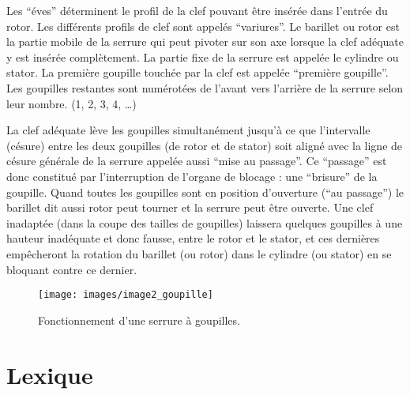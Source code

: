 \documentclass[a4paper,french,11pt,twoside]{report}
\begin{document}
Les \enquote{éves} déterminent le profil de la clef pouvant être insérée dans l'entrée du rotor. Les différents profils de clef sont appelés \enquote{variures}. Le barillet ou rotor est la partie mobile de la serrure qui peut pivoter sur son axe lorsque la clef adéquate y est insérée complètement. La partie fixe de la serrure est appelée le cylindre ou stator. La première goupille touchée par la clef est appelée \enquote{première goupille}. Les goupilles restantes sont numérotées de l'avant vers l'arrière de la serrure selon leur nombre. (1, 2, 3, 4, \ldots)

La clef adéquate lève les goupilles simultanément jusqu'à ce que l'intervalle (césure) entre les deux goupilles (de rotor et de stator) soit aligné avec la ligne de césure générale de la serrure appelée aussi \enquote{mise au  passage}. Ce \enquote{passage} est donc constitué par l'interruption de l'organe de blocage : une \enquote{brisure} de la goupille.  Quand toutes les goupilles sont en position d'ouverture (\enquote{au passage}) le barillet dit aussi rotor peut tourner et la serrure peut être ouverte. Une clef inadaptée (dans la coupe des tailles de goupilles) laissera quelques goupilles à une hauteur inadéquate et donc fausse, entre le rotor et le stator, et ces dernières empêcheront la rotation du barillet (ou rotor) dans le cylindre (ou stator) en se bloquant contre ce dernier.


\begin{figure}[ht]
  \texttt{[image: images/image2\_goupille]}
  \caption{Fonctionnement d'une serrure à goupilles.\label{fonctionnement_serrure_goupilles}}
\end{figure}


\section*{Lexique}
\end{document}
